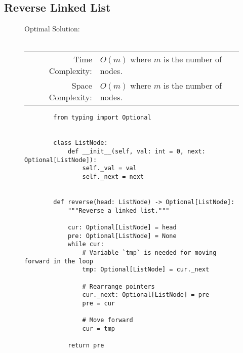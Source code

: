 
\subsection{Reverse Linked List}

\begin{figure}[H]
    Optimal Solution:\\\\
    \begin{tabular}{rl}
        Time Complexity:& \(O(m)\) where \(m\) is the number of nodes.\\
        Space Complexity:& \(O(m)\) where \(m\) is the number of nodes.
    \end{tabular}
\end{figure}

\begin{figure}[H]
    \centering
    \begin{verbatim}
        from typing import Optional


        class ListNode:
            def __init__(self, val: int = 0, next: Optional[ListNode]):
                self._val = val
                self._next = next


        def reverse(head: ListNode) -> Optional[ListNode]:
            """Reverse a linked list."""

            cur: Optional[ListNode] = head
            pre: Optional[ListNode] = None
            while cur:
                # Variable `tmp` is needed for moving forward in the loop
                tmp: Optional[ListNode] = cur._next

                # Rearrange pointers
                cur._next: Optional[ListNode] = pre
                pre = cur

                # Move forward
                cur = tmp

            return pre
    \end{verbatim}
\end{figure}

